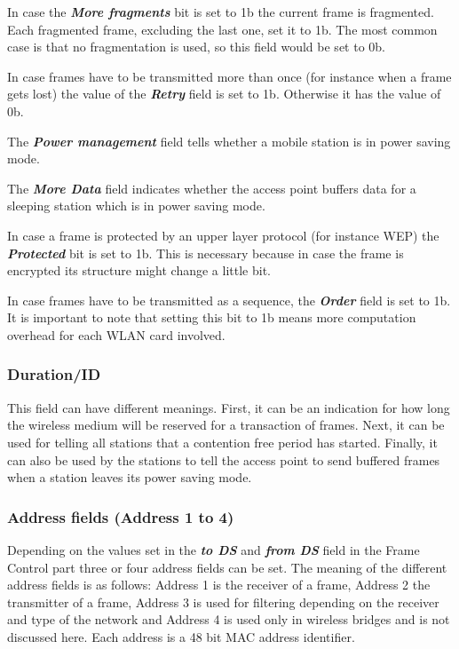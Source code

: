 In case the {\bf{\em More fragments}} bit is set to 1b the current frame is fragmented. Each fragmented frame, excluding the last one, set it to 1b. The most common case is that no fragmentation is used, so this field would be set to 0b.

In case frames have to be transmitted more than once (for instance when a frame gets lost) the value of the {\bf{\em Retry}} field is set to 1b. Otherwise it has the value of 0b.

The {\bf{\em Power management}} field tells whether a mobile station is in power saving mode.

The {\bf{\em More Data}} field indicates whether the access point buffers data for a sleeping station which is in power saving mode.

In case a frame is protected by an upper layer protocol (for instance WEP) the {\bf{\em Protected}} bit is set to 1b. This is necessary because in case the frame is encrypted its structure might change a little bit.

In case frames have to be transmitted as a sequence, the {\bf{\em Order}} field is set to 1b. It is important to note that setting this bit to 1b means more computation overhead for each WLAN card involved.

\subsubsection{Duration/ID}

This field can have different meanings. First, it can be an indication for how long the wireless medium will be reserved for a transaction of frames. Next, it can be used for telling all stations that a contention free period has started. Finally, it can also be used by the stations to tell the access point to send buffered frames when a station leaves its power saving mode.

\subsubsection{Address fields (Address 1 to 4)}

Depending on the values set in the {\bf{\em to DS}} and {\bf{\em from DS}} field in the Frame Control part three or four address fields can be set. The meaning of the different address fields is as follows: Address 1 is the receiver of a frame, Address 2 the transmitter of a frame, Address 3 is used for filtering depending on the receiver and type of the network and Address 4 is used only in wireless bridges and is not discussed here. Each address is a 48 bit MAC address identifier.

